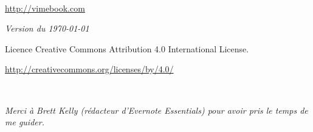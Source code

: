 
\setcounter{tocdepth}{1}



\frontmatter

\maketitle

\newpage
\begin{fullwidth}
~\vfill
\thispagestyle{empty}
\setlength{\parindent}{0pt}
\setlength{\parskip}{\baselineskip}

\par{}

\par \url{http://vimebook.com}
\par\textit{Version du  \today}
\par{Licence  Creative Commons Attribution 4.0 International License.}
\par{\url{http://creativecommons.org/licenses/by/4.0/}}

\end{fullwidth}

\tableofcontents


\cleardoublepage
~\vfill
\begin{doublespace}
\noindent\fontsize{18}{22}\selectfont\itshape
\nohyphenation
Merci à Brett Kelly (rédacteur d'Evernote Essentials) pour avoir pris le temps de me guider.
\end{doublespace}
\vfill
\vfill

\cleardoublepage





\mainmatter









\listoffigures

\printindex



